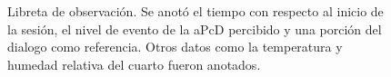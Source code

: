 \begin{figure}[h]
        \centering
        \caption{Libreta de observaci\'on. Se anot\'o el tiempo con respecto al inicio de la sesi\'on, el nivel de evento de la aPcD percibido y una porci\'on del dialogo como referencia. Otros datos como la temperatura y humedad relativa del cuarto fueron anotados.}\label{fig:imgobservation}
\end{figure}

